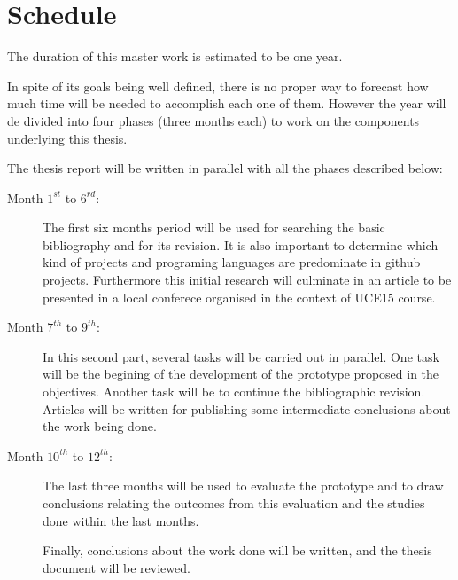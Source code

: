 \documentclass[12pt]{article}
\begin{document}
\section{Schedule}

The duration of this master work is estimated to be one year. 

In spite of its goals being well defined, there is no proper way to forecast how much time will be needed to accomplish each one of them. However the year will de divided into four phases (three months each) to work on the components underlying this thesis.

The thesis report will be written in parallel with all the phases described below: 

\begin{description}
\item[Month $1^{st}$ to $6^{rd}$:] The first six months period will be used for searching the basic bibliography and for its revision. 
It is also important to determine which kind of projects and programing languages are predominate in github projects. 
Furthermore this initial research will culminate in an article to be presented in a local conferece organised in the context of UCE15 course.

\item[Month $7^{th}$ to $9^{th}$:] In this second part, several tasks will be carried out in parallel. 
One task will be the begining of the development of the prototype proposed in the objectives. 
Another task will be to continue the bibliographic revision. 
Articles will be written for publishing some intermediate conclusions about the work being done.

\item[Month $10^{th}$ to $12^{th}$:] The last three months will be used to evaluate the prototype and to draw conclusions relating the outcomes from this evaluation and the studies done within the last months.

Finally, conclusions about the work done will be written, and the thesis document will be reviewed.

\end{description}




{
\small


}
\end{document}
